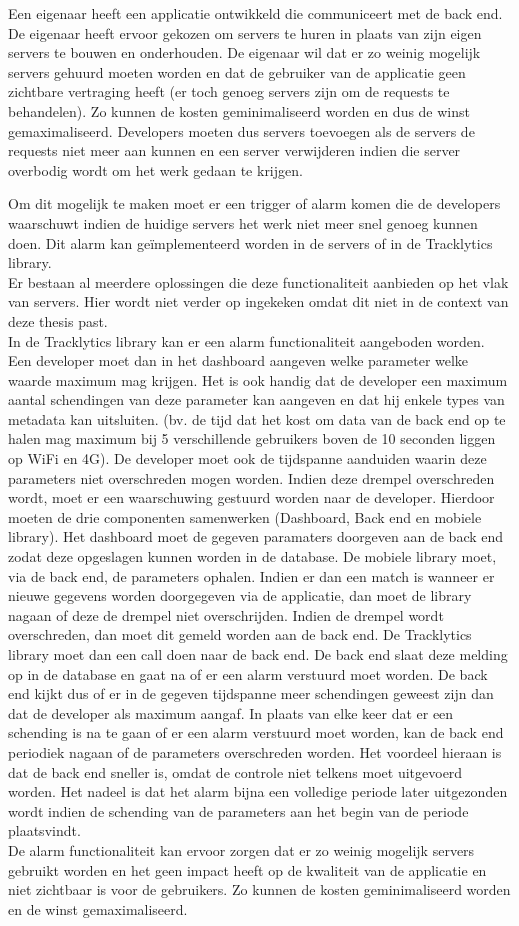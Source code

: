 Een eigenaar heeft een applicatie ontwikkeld die communiceert met de back end. De eigenaar heeft ervoor gekozen om servers te huren in plaats van zijn eigen servers te bouwen en onderhouden. De eigenaar wil dat er zo weinig mogelijk servers gehuurd moeten worden en dat de gebruiker van de applicatie geen zichtbare vertraging heeft (er toch genoeg servers zijn om de requests te behandelen). Zo kunnen de kosten geminimaliseerd worden en dus de winst gemaximaliseerd. Developers moeten dus servers toevoegen als de servers de requests niet meer aan kunnen en een server verwijderen indien die server overbodig wordt om het werk gedaan te krijgen. 

Om dit mogelijk te maken moet er een trigger of alarm komen die de developers waarschuwt indien de huidige servers het werk niet meer snel genoeg kunnen doen. Dit alarm kan ge\"implementeerd worden in de servers of in de Tracklytics library. \\

Er bestaan al meerdere oplossingen die deze functionaliteit aanbieden op het vlak van servers. Hier wordt niet verder op ingekeken omdat dit niet in de context van deze thesis past. \\

In de Tracklytics library kan er een alarm functionaliteit aangeboden worden. Een developer moet dan in het dashboard aangeven welke parameter welke waarde maximum mag krijgen. Het is ook handig dat de developer een maximum aantal schendingen van deze parameter kan aangeven en dat hij enkele types van metadata kan uitsluiten. (bv. de tijd dat het kost om data van de back end op te halen mag maximum bij 5 verschillende gebruikers boven de 10 seconden liggen op WiFi en 4G). De developer moet ook de tijdspanne aanduiden waarin deze parameters niet overschreden mogen worden. Indien deze drempel overschreden wordt, moet er een waarschuwing gestuurd worden naar de developer. Hierdoor moeten de drie componenten samenwerken (Dashboard, Back end en mobiele library). Het dashboard moet de gegeven paramaters doorgeven aan de back end zodat deze opgeslagen kunnen worden in de database. De mobiele library moet, via de back end, de parameters ophalen. Indien er dan een match is wanneer er nieuwe gegevens worden doorgegeven via de applicatie, dan moet de library nagaan of deze de drempel niet overschrijden. Indien de drempel wordt overschreden, dan moet dit gemeld worden aan de back end. De Tracklytics library moet dan een call doen naar de back end. De back end slaat deze melding op in de database en gaat na of er een alarm verstuurd moet worden. De back end kijkt dus of er in de gegeven tijdspanne meer schendingen geweest zijn dan dat de developer als maximum aangaf. In plaats van elke keer dat er een schending is na te gaan of er een alarm verstuurd moet worden, kan de back end periodiek nagaan of de parameters overschreden worden. Het voordeel hieraan is dat de back end sneller is, omdat de controle niet telkens moet uitgevoerd worden. Het nadeel is dat het alarm bijna een volledige periode later uitgezonden wordt indien de schending van de parameters aan het begin van de periode plaatsvindt. \\

De alarm functionaliteit kan ervoor zorgen dat er zo weinig mogelijk servers gebruikt worden en het geen impact heeft op de kwaliteit van de applicatie en niet zichtbaar is voor de gebruikers. Zo kunnen de kosten geminimaliseerd worden en de winst gemaximaliseerd. 